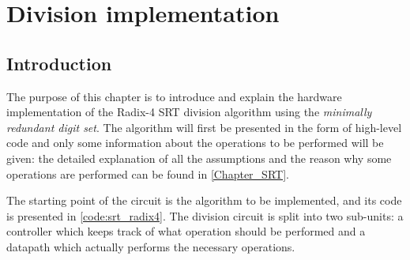 \chapter{Division implementation}\label{Chapter_Impl_Div}
\section{Introduction}
The purpose of this chapter is to introduce and explain the hardware implementation of the Radix-4 SRT division algorithm using the \textit{minimally redundant digit set}.
The algorithm will first be presented in the form of high-level code and only some information about the operations to be performed will be given: the detailed explanation of all the assumptions and the reason why some operations are performed can be found in \autoref{Chapter_SRT}.

The starting point of the circuit is the algorithm to be implemented, and its code is presented in \autoref{code:srt_radix4}.
The division circuit is split into two sub-units: a controller which keeps track of what operation should be performed  and a datapath which actually performs the necessary operations.

